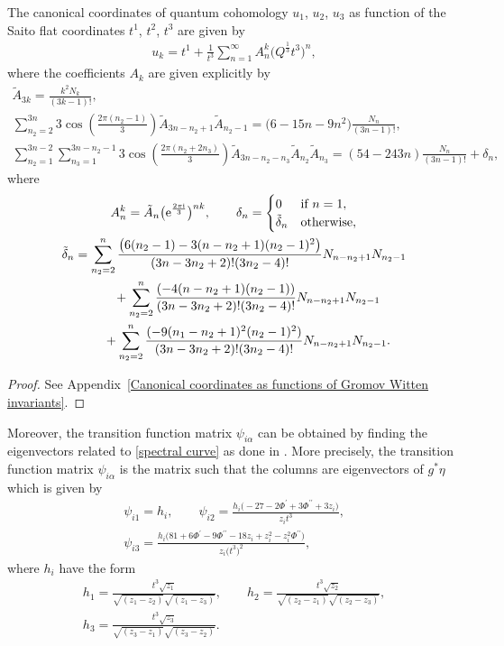 \begin{Lemma}
The canonical coordinates of quantum cohomology $u_1$, $u_2$, $u_3$ as function of the Saito flat coordinates $t^1$, $t^2$, $t^3$ are given by
\begin{gather}\label{canonical coordinates lemma1}
u_k=t^1+\frac{1}{t^3}\sum_{n=1}^{\infty} A_n^k \bigl( Q^{\frac{1}{3}}t^3 \bigr)^n,
\end{gather}
where the coefficients $A_{k}$ are given explicitly by
\begin{gather*}
\tilde A_{3k}=\frac{k^2N_k}{(3k-1)! },\\
\sum_{n_2=2}^{3n}3\cos\left( \frac{2\pi (n_2-1)}{3}\right) \tilde A_{3n-n_2+1} \tilde A_{n_2-1}=\bigl(6-15n-9n^2 \bigr)\frac{N_n}{(3n-1)!},\\
\sum_{n_2=1}^{3n-2}\sum_{n_3=1}^{3n-n_2-1}3\cos\left( \frac{2\pi (n_2+2n_3 )}{3} \right) \tilde A_{3n-n_2-n_3} \tilde A_{n_2} \tilde A_{n_3}=(54-243n )\frac{N_n}{(3n-1)!}+\delta_{n} ,
\end{gather*}
where
\begin{gather*}
A_n^k=\tilde A_n \bigl( {\rm e}^{\frac{2\pi {\rm i}}{3}}\bigr)^{nk},
\qquad
\delta_n=
\begin{cases}
0& \text{if } n=1,\\
 \tilde\delta_n & \text{otherwise},
\end{cases}
\\
\tilde\delta_n=\sum_{n_2=2}^{n}\frac{\bigl(6(n_2-1)-3(n-n_2+1)(n_2-1)^2 \bigr)}{(3n-3n_2+2)!(3n_2-4)!} N_{n-n_2+1}N_{n_2-1}\\
\phantom{\tilde\delta_n=}{}+\sum_{n_2=2}^{n}\frac{(-4(n-n_2+1)(n_2-1) )}{(3n-3n_2+2)!(3n_2-4)!} N_{n-n_2+1}N_{n_2-1}\\
\phantom{\tilde\delta_n=}{}+\sum_{n_2=2}^{n}\frac{(-9(n_1-n_2+1)^2(n_2-1)^2 )}{(3n-3n_2+2)!(3n_2-4)!} N_{n-n_2+1}N_{n_2-1}.
\end{gather*}
\end{Lemma}

\begin{proof}
See Appendix~\ref{Canonical coordinates as functions of Gromov Witten invariants}.
\end{proof}

Moreover, the transition function matrix $\psi_{i \alpha}$ can be obtained by finding the eigenvectors related to \eqref{spectral curve} as done in \cite[Example 3.10.34]{B.Dubrovin4}. More precisely, the transition function matrix $\psi_{i \alpha}$ is the matrix such that the columns are eigenvectors of
$g^{*}\eta$
which is given by
\begin{gather*}
\psi_{i1}=h_i,\qquad
\psi_{i2}=\frac{h_i\bigl( -27-2\Phi^{\prime}+3\Phi^{\prime\prime} +3z_i \bigr)}{z_it^3},\\
\psi_{i3}=\frac{h_i\bigl( 81+6\Phi^{\prime}-9\Phi^{\prime\prime}-18z_i+z_i^2-z_i^2\Phi^{\prime\prime} \bigr)}{z_i\bigl(t^3\bigr)^2},
\end{gather*}
where $h_i$ have the form
\begin{gather*}
h_1=\frac{t^3\sqrt{z_1}}{\sqrt{(z_1-z_2)}\sqrt{(z_1-z_3)}}, \qquad h_2=\frac{t^3\sqrt{z_2}}{\sqrt{(z_2-z_1)}\sqrt{(z_2-z_3)}}, \\ h_3=\frac{t^3\sqrt{z_3}}{\sqrt{(z_3-z_1)}\sqrt{(z_3-z_2)}}.
\end{gather*}

